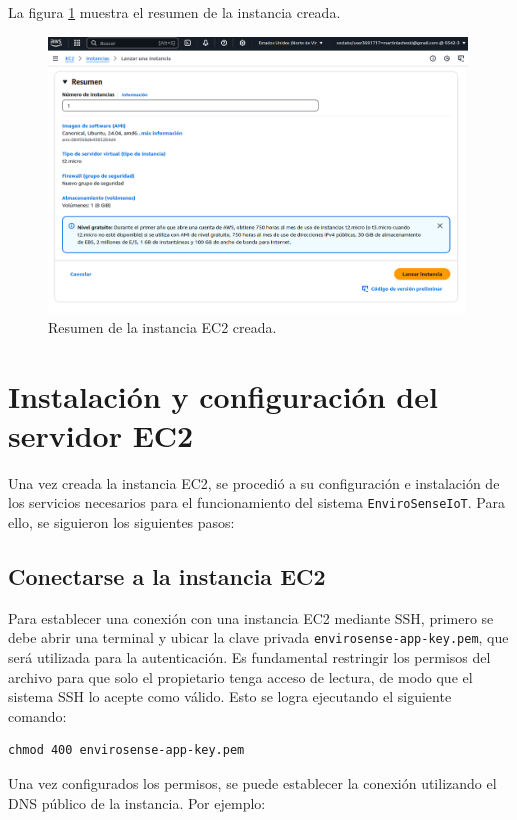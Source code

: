 La figura \ref{fig:aws-ec2} muestra el resumen de la instancia creada.
\begin{figure}[H]
    \centering
    \includegraphics[width=0.99\textwidth]{./Images/32-ec2-1.png}
    \caption{Resumen de la instancia EC2 creada.}
    \label{fig:aws-ec2}
\end{figure}

\section{Instalación y configuración del servidor EC2}

Una vez creada la instancia EC2, se procedió a su configuración e instalación
de los servicios necesarios para el funcionamiento del sistema
\texttt{EnviroSenseIoT}. Para ello, se siguieron los siguientes pasos:

\subsection{Conectarse a la instancia EC2}
Para establecer una conexión con una instancia EC2 mediante SSH, primero se
debe abrir una terminal y ubicar la clave privada
\texttt{envirosense-app-key.pem}, que será utilizada para la autenticación. Es
fundamental restringir los permisos del archivo para que solo el propietario
tenga acceso de lectura, de modo que el sistema SSH lo acepte como válido. Esto
se logra ejecutando el siguiente comando:

\begin{verbatim}
chmod 400 envirosense-app-key.pem
\end{verbatim}

Una vez configurados los permisos, se puede establecer la conexión utilizando
el DNS público de la instancia. Por ejemplo:

